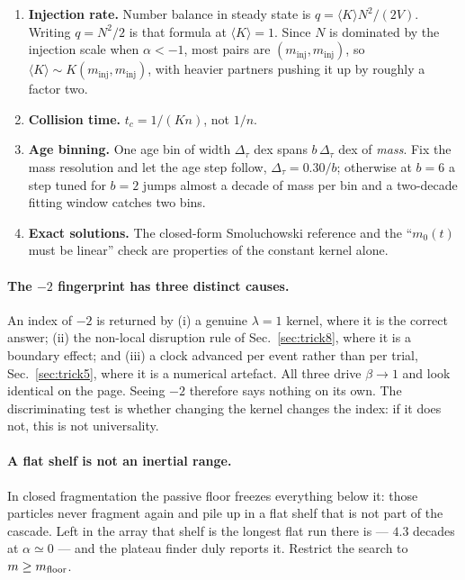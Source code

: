 \documentclass[a4paper,12pt]{article}
\newcommand{\minj}{m_{\mathrm{inj}}}
\begin{document}
\begin{enumerate}
  \item \textbf{Injection rate.} Number balance in steady state is
        $q = \langle K\rangle N^2/(2V)$. Writing $q = N^2/2$ is that formula
        at $\langle K\rangle = 1$. Since $N$ is dominated by the injection
        scale when $\alpha<-1$, most pairs are $(\minj,\minj)$, so
        $\langle K \rangle \sim K(\minj,\minj)$, with heavier partners
        pushing it up by roughly a factor two.
  \item \textbf{Collision time.} $t_c = 1/(Kn)$, not $1/n$.
  \item \textbf{Age binning.} One age bin of width $\Delta_\tau$ dex spans
        $b\,\Delta_\tau$ dex of \emph{mass}. Fix the mass resolution and let
        the age step follow, $\Delta_\tau = 0.30/b$; otherwise at $b=6$ a
        step tuned for $b=2$ jumps almost a decade of mass per bin and a
        two-decade fitting window catches two bins.
  \item \textbf{Exact solutions.} The closed-form Smoluchowski reference and
        the ``$m_0(t)$ must be linear'' check are properties of the constant
        kernel alone.
\end{enumerate}

\paragraph{The $-2$ fingerprint has three distinct causes.}
An index of $-2$ is returned by (i) a genuine $\lambda = 1$ kernel, where it
is the correct answer; (ii) the non-local disruption rule of
Sec.~\ref{sec:trick8}, where it is a boundary effect; and (iii) a clock
advanced per event rather than per trial, Sec.~\ref{sec:trick5}, where it is
a numerical artefact. All three drive $\beta \to 1$ and look identical on the
page. Seeing $-2$ therefore says nothing on its own. The discriminating test
is whether changing the kernel changes the index: if it does not, this is not
universality.

\paragraph{A flat shelf is not an inertial range.}
In closed fragmentation the passive floor freezes everything below it: those
particles never fragment again and pile up in a flat shelf that is not part
of the cascade. Left in the array that shelf is the longest flat run there
is --- $4.3$ decades at $\alpha \simeq 0$ --- and the plateau finder duly
reports it. Restrict the search to $m \ge m_{\rm floor}$.

\end{document}
